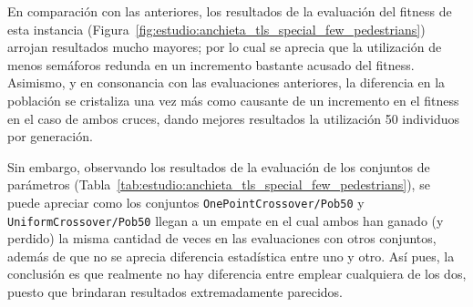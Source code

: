 En comparación con las anteriores, los resultados de la evaluación del fitness de esta instancia (Figura~\ref{fig:estudio:anchieta_tls_special_few_pedestrians}) arrojan resultados mucho mayores; por lo cual se aprecia que la utilización de menos semáforos redunda en un incremento bastante acusado del fitness. Asimismo, y en consonancia con las evaluaciones anteriores, la diferencia en la población se cristaliza una vez más como causante de un incremento en el fitness en el caso de ambos cruces, dando mejores resultados la utilización 50 individuos por generación.

Sin embargo, observando los resultados de la evaluación de los conjuntos de parámetros (Tabla~\ref{tab:estudio:anchieta_tls_special_few_pedestrians}), se puede apreciar como los conjuntos \texttt{OnePointCrossover/Pob50} y \texttt{UniformCrossover/Pob50} llegan a un empate en el cual ambos han ganado (y perdido) la misma cantidad de veces en las evaluaciones con otros conjuntos, además de que no se aprecia diferencia estadística entre uno y otro. Así pues, la conclusión es que realmente no hay diferencia entre emplear cualquiera de los dos, puesto que brindaran resultados extremadamente parecidos.

